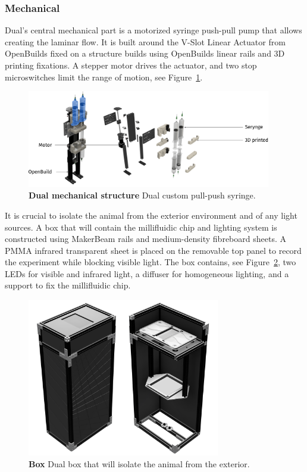   \subsubsection{Mechanical}
  Dual's central mechanical part is a motorized syringe push-pull pump that allows creating the laminar flow. It is built around the V-Slot Linear Actuator from OpenBuilds fixed on a structure builds using OpenBuilds linear rails and 3D printing fixations. A stepper motor drives the actuator, and two stop microswitches limit the range of motion, see Figure~\ref{dual_mechanical}.

    \begin{figure}[h]
      \centering
      \includegraphics[width=0.95\textwidth]{part_2/assets/pull_push.png}
      \caption{\textbf{Dual mechanical structure} Dual custom pull-push syringe.}
      \label{dual_mechanical}
    \end{figure}

  It is crucial to isolate the animal from the exterior environment and of any light sources. A box that will contain the millifluidic chip and lighting system is constructed using MakerBeam rails and medium-density fibreboard sheets. A PMMA infrared transparent sheet is placed on the removable top panel to record the experiment while blocking visible light. The box contains, see Figure~\ref{dual_box}, two LEDs for visible and infrared light, a diffuser for homogeneous lighting, and a support to fix the millifluidic chip.

    \begin{figure}[h]
      \centering
      \includegraphics[width=0.75\textwidth]{part_2/assets/box.png}
      \caption{\textbf{Box} Dual box that will isolate the animal from the exterior.}
      \label{dual_box}
    \end{figure}

